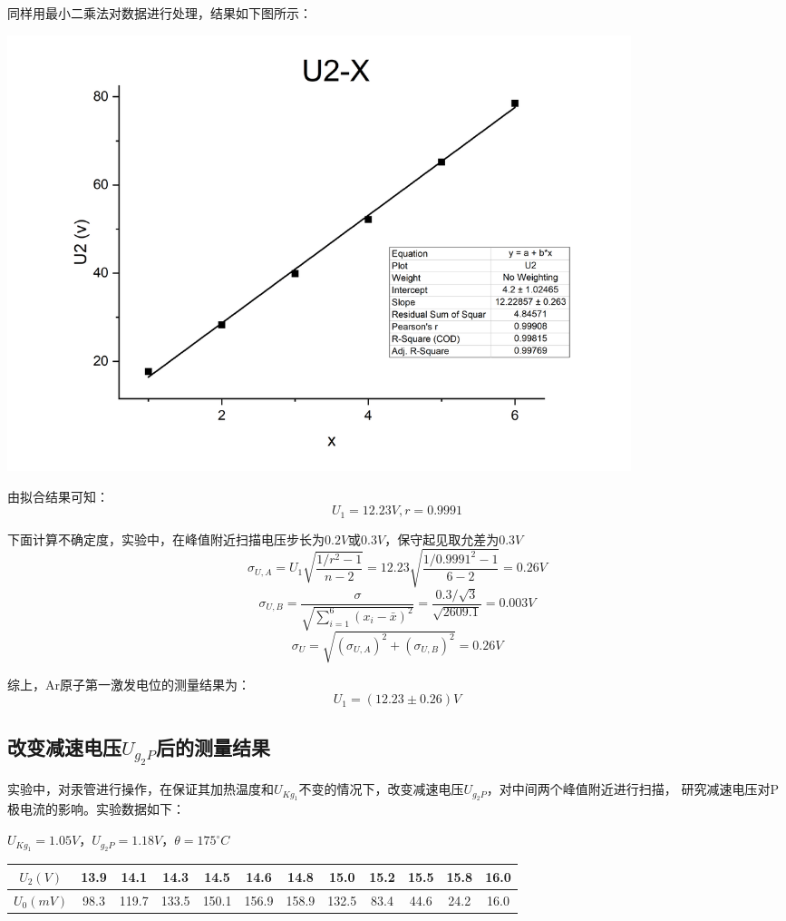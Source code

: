 \documentclass{article}
\newcommand{\degreesCelsius}{^\circ C}
\begin{document}
    同样用最小二乘法对数据进行处理，结果如下图所示：

    \begin{center}
        \includegraphics[width=0.8\textwidth]{Ar activate.jpg}
    \end{center}

    由拟合结果可知：
    $$U_1=12.23V,r=0.9991$$

    下面计算不确定度，实验中，在峰值附近扫描电压步长为$0.2V$或$0.3V$，保守起见取允差为$0.3V$
    $$\sigma_{U,A}=U_1\sqrt{\frac{1/r^2-1}{n-2}}=12.23\sqrt{\frac{1/0.9991^2-1}{6-2}}=0.26V$$
    $$\sigma_{U,B}=\frac{\sigma}{\sqrt{\sum_{i=1}^6 (x_i-\bar{x})^2}}=\frac{0.3/\sqrt{3}}{\sqrt{2609.1}}=0.003V$$
    $$\sigma_{U}=\sqrt{(\sigma_{U,A})^2+(\sigma_{U,B})^2}=0.26V$$

    综上，Ar原子第一激发电位的测量结果为：
    $$U_1=(12.23\pm0.26)V$$

    \subsection{改变减速电压$U_{g_2P}$后的测量结果}
    实验中，对汞管进行操作，在保证其加热温度和$U_{Kg_1}$不变的情况下，改变减速电压$U_{g_2P}$，对中间两个峰值附近进行扫描，
    研究减速电压对P极电流的影响。实验数据如下：

    $U_{Kg_1}=1.05V，U_{g_2P}=1.18V，\theta =175\degreesCelsius$

    \begin{center}
        \begin{tabular}{|c|c|c|c|c|c|c|c|c|c|c|c|}
            \hline
            $U_2(V)$ & 13.9  & 14.1  & 14.3  & 14.5  & 14.6  & 14.8  & 15.0  & 15.2  & 15.5  & 15.8  & 16.0  \bigstrut\\
            \hline
            $U_0(mV)$ & 98.3  & 119.7  & 133.5  & 150.1  & 156.9  & 158.9  & 132.5  & 83.4  & 44.6  & 24.2  & 16.0  \bigstrut\\
            \hline
        \end{tabular}%
    \end{center}
\end{document}
